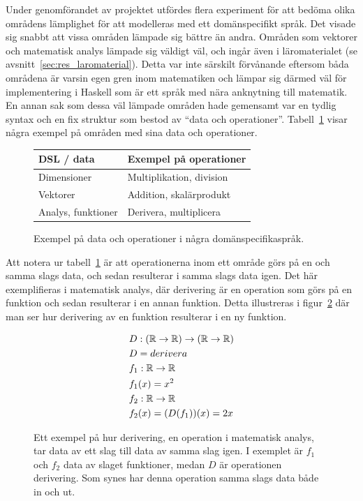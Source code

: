 Under genomförandet av projektet utfördes flera experiment för att bedöma olika
områdens lämplighet för att modelleras med ett domänspecifikt språk. Det visade
sig snabbt att vissa områden lämpade sig bättre än andra. Områden
som vektorer och matematisk analys lämpade sig väldigt väl, och ingår även i
läromaterialet (se avsnitt~\ref{sec:res_laromaterial}). Detta var inte särskilt
förvånande eftersom båda områdena är varsin egen gren inom matematiken
och lämpar sig därmed väl för implementering i Haskell som är ett språk med nära
anknytning till matematik. En annan sak som dessa väl lämpade områden hade
gemensamt var en tydlig syntax och en fix struktur som bestod av ``data och
operationer''. Tabell~\ref{tab:data_och_ops} visar några exempel på områden med
sina data och operationer.

\captionsetup[figure]{name=Tabell}

\begin{figure}[tph]
\centering
\caption{Exempel på data och operationer i några domänspecifikaspråk.}\label{tab:data_och_ops} 
\begin{tabular}{l|l}
\toprule
DSL / data & Exempel på operationer \\ \midrule
Dimensioner & Multiplikation, division \\
Vektorer & Addition, skalärprodukt \\
Analys, funktioner & Derivera, multiplicera \\ \bottomrule
\end{tabular}
\end{figure}

\captionsetup[figure]{name=Figur}

Att notera ur tabell~\ref{tab:data_och_ops} är att operationerna inom ett område
görs på en och samma slags data, och sedan resulterar i samma slags data igen.
Det här exemplifieras i matematisk analys, där derivering är en operation som
görs på en funktion och sedan resulterar i en annan funktion. Detta illustreras
i figur~\ref{fig:analys_op_exempel} där man ser hur derivering av en funktion
resulterar i en ny funktion.

\begin{figure}[tph]
\begin{mdframed}
  \vspace{-0.5cm}
\begin{align*}
  &D : (\mathbb{R} \rightarrow \mathbb{R}) \rightarrow (\mathbb{R} \rightarrow \mathbb{R}) \\
  &D = derivera \\
  &f_1 : \mathbb{R} \rightarrow \mathbb{R} \\
  &f_1(x) = x^2 \\
  &f_2 : \mathbb{R} \rightarrow \mathbb{R} \\
  &f_2(x) = (D(f_1))(x) = 2x
\end{align*}
\end{mdframed}
\caption{Ett exempel på hur derivering, en operation i matematisk analys, tar
data av ett slag till data av samma slag igen. I exemplet är $f_1$ och $f_2$
data av slaget funktioner, medan $D$ är operationen derivering. Som synes har
denna operation samma slags data både in och ut.}\label{fig:analys_op_exempel}
\end{figure}


